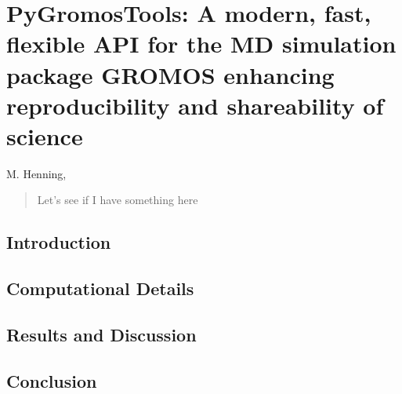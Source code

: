 \documentclass[../main.tex]{subfiles}
\begin{document}
\renewcommand{\path}{3_chapter_1/}
\chapter[PyGromosTools an API making development of scientific projects faster, more reproducibile and shareable]{PyGromosTools:  A modern, fast, flexible API for the MD simulation package GROMOS enhancing reproducibility and shareability of science}
\label{ch:pyGrom}

{M. Henning,  \cite{Henning2009}}




\begin{abstract}
Let's see if I have something here
%
\end{abstract}

\clearpage
\pagebreak

\section{Introduction}



\section{Computational Details}



\section{Results and Discussion}



\clearpage
\newpage

\section{Conclusion}



\clearpage
\pagebreak


\end{document}
